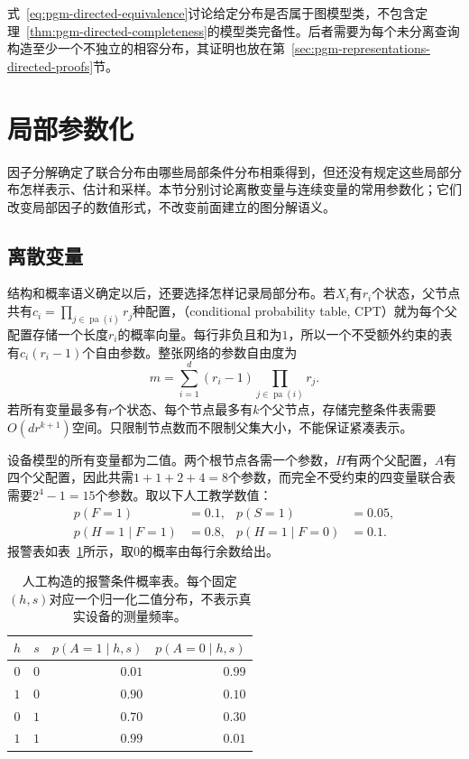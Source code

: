 式~\eqref{eq:pgm-directed-equivalence}讨论给定分布是否属于图模型类，不包含定理~\ref{thm:pgm-directed-completeness}的模型类完备性。后者需要为每个未分离查询构造至少一个不独立的相容分布，其证明也放在第~\ref{sec:pgm-representations-directed-proofs}节。

\section{局部参数化}
\label{sec:pgm-directed-local-parameterization}

因子分解确定了联合分布由哪些局部条件分布相乘得到，但还没有规定这些局部分布怎样表示、估计和采样。本节分别讨论离散变量与连续变量的常用参数化；它们改变局部因子的数值形式，不改变前面建立的图分解语义。

\subsection{离散变量}
\label{sec:pgm-directed-discrete}

结构和概率语义确定以后，还要选择怎样记录局部分布。若$X_i$有$r_i$个状态，父节点共有$c_i=\prod_{j\in\operatorname{pa}(i)}r_j$种配置，（conditional probability table, CPT）就为每个父配置存储一个长度$r_i$的概率向量。每行非负且和为$1$，所以一个不受额外约束的表有$c_i(r_i-1)$个自由参数。整张网络的参数自由度为
\begin{equation}
  m=\sum_{i=1}^{d}(r_i-1)
       \prod_{j\in\operatorname{pa}(i)}r_j.
  \label{eq:pgm-directed-cpt-size}
\end{equation}
若所有变量最多有$r$个状态、每个节点最多有$k$个父节点，存储完整条件表需要$O(dr^{k+1})$空间。只限制节点数而不限制父集大小，不能保证紧凑表示。

设备模型的所有变量都为二值。两个根节点各需一个参数，$H$有两个父配置，$A$有四个父配置，因此共需$1+1+2+4=8$个参数，而完全不受约束的四变量联合表需要$2^4-1=15$个参数。取以下人工教学数值：
\[
  \begin{aligned}
    p(F=1)&=0.1,& p(S=1)&=0.05,\\
    p(H=1\mid F=1)&=0.8,&
    p(H=1\mid F=0)&=0.1.
  \end{aligned}
\]
报警表如表~\ref{tab:pgm-directed-alarm-cpt}所示，取$0$的概率由每行余数给出。

\begin{table}[htbp]
  \centering
  \begin{tabular}{@{}ccrr@{}}
    \toprule
    $h$ & $s$ & $p(A=1\mid h,s)$ & $p(A=0\mid h,s)$ \\
    \midrule
    $0$ & $0$ & $0.01$ & $0.99$ \\
    $1$ & $0$ & $0.90$ & $0.10$ \\
    $0$ & $1$ & $0.70$ & $0.30$ \\
    $1$ & $1$ & $0.99$ & $0.01$ \\
    \bottomrule
  \end{tabular}
  \caption{人工构造的报警条件概率表。每个固定$(h,s)$对应一个归一化二值分布，不表示真实设备的测量频率。}
  \label{tab:pgm-directed-alarm-cpt}
\end{table}

